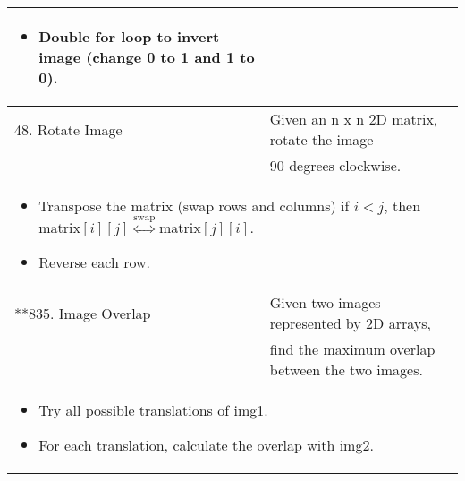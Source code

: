 \begin{summary}
\begin{center}
\begin{tabular}{ll}
{\begin{itemize}
                    \item Double for loop to invert image (change 0 to 1 and 1 to 0).
                \end{itemize}
            } \\
            \midrule
            48. Rotate Image & Given an n x n 2D matrix, rotate the image \\
            & 90 degrees clockwise. \\
            \multicolumn{2}{p{\linewidth}}{
                \begin{itemize}
                    \item Transpose the matrix (swap rows and columns) if $i<j$, then $\text{matrix}[i][j] \overset{\text{swap}}{\iff} \text{matrix}[j][i]$.
                    \item Reverse each row.
                \end{itemize}
            } \\
            \midrule
            **835. Image Overlap & Given two images represented by 2D arrays, \\
            & find the maximum overlap between the two images. \\
            \multicolumn{2}{p{\linewidth}}{
                \begin{itemize}
                    \item Try all possible translations of img1. 
                    \item For each translation, calculate the overlap with img2.
                \end{itemize}
            }
        \end{tabular}
    \end{center}
\end{summary}